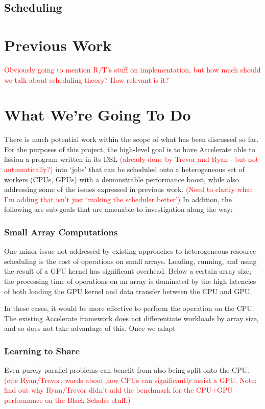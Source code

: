 \documentclass[a4paper,12pt]{article}
\newcommand{\red}[1]{\textcolor{red}{#1}}
\begin{document}
\subsection{Scheduling}



\section{Previous Work}
\red{Obviously going to mention R/T's stuff on implementation, but how much should we talk about scheduling theory? How relevant is it?}

\section{What We're Going To Do}
There is much potential work within the scope of what has been discussed so far.
For the purposes of this project, the high-level goal is to have Accelerate able to fission a program written in its DSL \red{(already done by Trevor and Ryan - but not automatically?)} into `jobs' that can be scheduled onto a heterogeneous set of workers (CPUs, GPUs) with a demonstrable performance boost, while also addressing some of the issues expressed in previous work.
\red{(Need to clarify what I'm adding that isn't just `making the scheduler better')}
In addition, the following are sub-goals that are amenable to investigation along the way:

\subsubsection*{Small Array Computations}
One minor issue not addressed by existing approaches to heterogeneous resource scheduling is the cost of operations on small arrays.
Loading, running, and using the result of a GPU kernel has significant overhead.
Below a certain array size, the processing time of operations on an array is dominated by the high latencies of both loading the GPU kernel and data transfer between the CPU and GPU.

In these cases, it would be more effective to perform the operation on the CPU.
The existing Accelerate framework does not differentiate workloads by array size, and so does not take advantage of this.
Once we adapt 

\subsubsection*{Learning to Share}
Even purely parallel problems can benefit from also being split onto the CPU.
\red{(cite Ryan/Trevor, words about how CPUs can significantly assist a GPU. Note: find out why Ryan/Trevor didn't add the benchmark for the CPU+GPU performance on the Black Scholes stuff.)}
\end{document}
